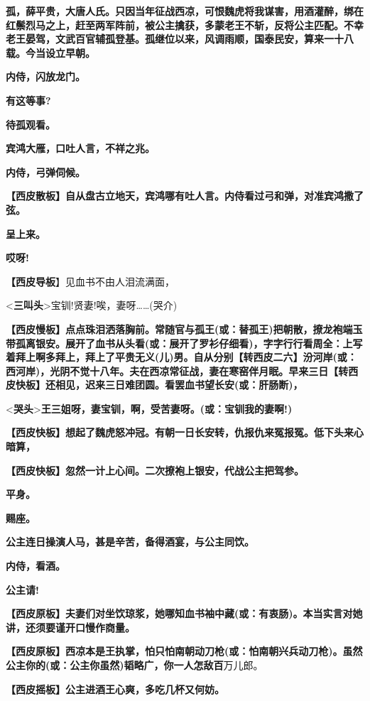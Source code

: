 \textbf{孤，薛平贵，大唐人氏。只因当年征战西凉，可恨魏虎将我谋害，用酒灌醉，绑在红鬃烈马之上，赶至两军阵前，被公主擒获，多蒙老王不斩，反将公主匹配。不幸老王晏驾，文武百官辅孤登基。孤继位以来，风调雨顺，国泰民安，算来一十八载。今当设立早朝。}

\textbf{内侍，闪放龙门。}

\textbf{有这等事?}

\textbf{待孤观看。}

\textbf{宾鸿大雁，口吐人言，不祥之兆。}

\textbf{内侍，弓弹伺候。}

\textbf{【西皮散板】自从盘古立地天，宾鸿哪有吐人言。内侍看过弓和弹，对准宾鸿撒了弦。}

\textbf{呈上来。}

\textbf{哎呀!}

\textbf{【西皮导板}】见血书不由人泪流满面，

\textless{}\textbf{三叫头}\textgreater{}宝钏!贤妻!唉，妻呀\ldots{}\ldots{}(哭介)

\textbf{【西皮慢板】点点珠泪洒落胸前。常随官与孤王(或：替孤王)把朝散，撩龙袍端玉带孤离银安。展开了血书从头看(或：展开了罗衫仔细看)，字字行行看周全：上写着拜上啊多拜上，拜上了平贵无义(儿)男。自从分别【转西皮二六】汾河岸(或：西河岸)，光阴不觉十八年。夫在西凉常征战，妻在寒窑伴月眠。早来三日【转西皮快板】还相见，迟来三日难团圆。看罢血书望长安(或：肝肠断)，}

\textless{}\textbf{哭头}\textgreater{}\textbf{王三姐呀，妻宝钏，啊，受苦妻呀。(或：宝钏我的妻啊!)}

\textbf{【西皮快板】想起了魏虎怒冲冠。有朝一日长安转，仇报仇来冤报冤。低下头来心暗算，}

\textbf{【西皮快板】忽然一计上心间。二次撩袍上银安，代战公主把驾参。}

\textbf{平身。}

\textbf{赐座。}

\textbf{公主连日操演人马，甚是辛苦，备得酒宴，与公主同饮。}

\textbf{内侍，看酒。}

\textbf{公主请!}

\textbf{【西皮原板】夫妻们对坐饮琼浆，她哪知血书袖中藏(或：有衷肠)。本当实言对她讲，还须要谨开口慢作商量。}

\textbf{【西皮原板】西凉本是王执掌，怕只怕南朝动刀枪(或：怕南朝兴兵动刀枪)。虽然公主你的(或：公主你虽然)韬略广，你一人怎敌百}万儿郎。

\textbf{【西皮摇板】公主进酒王心爽，多吃几杯又何妨。}

